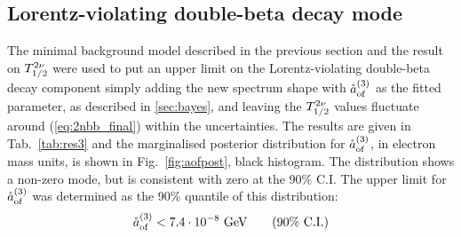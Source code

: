 \subsection*{Lorentz-violating double-beta decay mode}
The minimal background model described in the previous section and the result on $T_{1/2}^{2\nu}$ were used to put an upper limit on the Lorentz-violating double-beta decay component simply adding the new spectrum shape with $\mathring{a}_\text{of}^{(3)}$ as the fitted parameter, as described in \ref{sec:bayes}, and leaving the $T_{1/2}^{2\nu}$ values fluctuate around (\ref{eq:2nbb_final}) within the uncertainties. The results are given in Tab.~\ref{tab:res3} and the marginalised posterior distribution for $\mathring{a}_\text{of}^{(3)}$, in electron mass units, is shown in Fig.~\ref{fig:aofpost}, black histogram. The distribution shows a non-zero mode, but is consistent with zero at the 90\% C.I. The upper limit for $\mathring{a}_\text{of}^{(3)}$ was determined as the 90\% quantile of this distribution:
\begin{equation}\mathring{a}_\text{of}^{(3)}<7.4\cdot10^{-8}\ \text{GeV}\qquad(\text{90\% C.I.})\label{eq:aoflimit}\end{equation}
